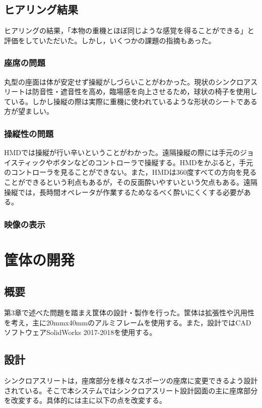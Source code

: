 \documentclass[a4paper,12pt]{jsarticle}
\begin{document}
\clearpage
\subsection{ヒアリング結果}
ヒアリングの結果，「本物の重機とほぼ同じような感覚を得ることができる」と評価をしていただいた。しかし，いくつかの課題の指摘もあった。

\subsubsection{座席の問題}
丸型の座面は体が安定せず操縦がしづらいことがわかった。現状のシンクロアスリートは防音性・遮音性を高め，臨場感を向上させるため，球状の椅子を使用している。しかし操縦の際は実際に重機に使われているような形状のシートである方が望ましい。

\subsubsection{操縦性の問題}
HMDでは操縦が行い辛いということがわかった。遠隔操縦の際には手元のジョイスティックやボタンなどのコントローラで操縦する。HMDをかぶると，手元のコントローラを見ることができない。また，HMDは360度すべての方向を見ることができるという利点もあるが，その反面酔いやすいという欠点もある。遠隔操縦では，長時間オペレータが作業するためなるべく酔いにくくする必要がある。

\subsubsection{映像の表示}


\clearpage

\section{筐体の開発}
\subsection{概要}
第3章で述べた問題を踏まえ筐体の設計・製作を行った。筐体は拡張性や汎用性を考え，主に20mmx40mmのアルミフレームを使用する。また，設計ではCADソフトウェアSolidWorks 2017-2018を使用する。

\subsection{設計}
シンクロアスリートは，座席部分を様々なスポーツの座席に変更できるよう設計されている。そこで本システムではシンクロアスリート設計図面の主に座席部分を改変する。具体的には主に以下の点を改変する。
\end{document}
